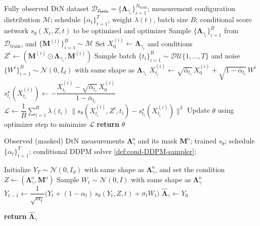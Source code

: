 \documentclass{article}
\begin{document}
\begin{algorithm}[H]
\caption{Training the conditional score network for DtN measurements completion}
\label{alg:train-conditional-score}
\begin{algorithmic}[1]
\Require Fully observed DtN dataset $\mathcal{D_{\text{train}}}=\{\mathbf{\Lambda}_{\gamma_i}\}_{i=1}^{N_{\text{train}}}$; measurement configuration distribution $\mathcal{M}$; schedule $\{\alpha_t\}_{t=1}^T$, weight $\lambda(t)$, batch size $B$; conditional score network $s_\theta(X_t,Z,t)$ to be optimized and optimizer
  \State Sample $\{\mathbf{\Lambda}_{\gamma_i}\}_{i=1}^B$ from $\mathcal{D}_{\text{train}}$, and $\{\mathbf{M}^{(i)}\}_{i=1}^B \sim \mathcal{M}$
  \State Set $X_0^{(i)} \gets\mathbf{\Lambda}_{\gamma_i}$ and conditions $Z^{i} \gets (\mathbf{M}^{(i)} \odot \mathbf{\Lambda}_{\gamma_i}, \mathbf{M}^{(i)})$
  \State Sample batch $\{t_i\}_{i=1}^B \sim \mathcal{DU}\{1,\dots,T\}$ and noise $\{W^{i}\}_{i=1}^B \sim \mathcal{N}(0,I_d)$ with same shape as $\mathbf{\Lambda}_{\gamma_i}$
  \State $X_{t_i}^{(i)} \gets \sqrt{\bar\alpha_{t_i}}\,X_0^{(i)} + \sqrt{1-\bar\alpha_{t_i}}\,W^{i}$ 
  \State $s_{t_i}^\star(X_{t_i}^{(i)}) \gets -\dfrac{X_{t_i}^{(i)}-\sqrt{\bar\alpha_{t_i}}\,X_0^{(i)}}{1-\bar\alpha_{t_i}}$ 
  \State $\mathcal{L} \gets \dfrac{1}{B}\sum_{i=1}^B \lambda(t_i)\,\big\|s_\theta(X_{t_i}^{(i)},Z^{i},t_i)-s_{t_i}^\star(X_{t_i}^{(i)})\big\|^2$
  \State Update $\theta$ using optimizer step to minimize $\mathcal{L}$
\EndWhile
\State \textbf{return} $\theta$ 
\end{algorithmic}
\end{algorithm}

\begin{algorithm}[H]
\caption{DtN measurements completion via conditional diffusion model}
\label{alg:complete-then-reconstruct}
\begin{algorithmic}[1]
\Require Observed (masked) DtN measurements $\mathbf{\Lambda}^{\text{o}}_{\gamma}$ and its mask $\mathbf{M}^{\text{o}}$; trained $s_\theta$; schedule $\{\alpha_t\}_{t=1}^T$; conditional DDPM solver \ref{def:cond-DDPM-sampler}; 

\State Initialize $Y_T \sim \mathcal{N}(0,I_d)$ with same shape as $\mathbf{\Lambda}_\gamma^{\text{o}}$, and set the condition $Z \gets (\mathbf{\Lambda}_\gamma^{\text{o}},\mathbf{M}^{\text{o}}) $
  \State Sample $W_t \sim \mathcal{N}(0,I)$ with same shape as $\mathbf{\Lambda}_\gamma^{\text{o}}$
  \State $Y_{t-1} \gets \dfrac{1}{\sqrt{\alpha_t}}\Big(Y_t + (1-\alpha_t)\, s_\theta(Y_t, Z, t) + \sigma_t W_t\Big)$ 
\EndFor
\State $\widehat{\mathbf{\Lambda}}_\gamma \gets Y_0$

\State \textbf{return} $\widehat{\mathbf{\Lambda}}_\gamma $ 
\end{algorithmic}
\end{algorithm}
\end{document}
